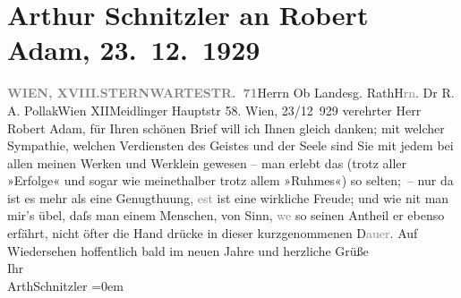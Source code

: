 

         
         \renewcommand{\erwaehntePersonen}{Personen: Robert Adam}
         \renewcommand{\erwaehnteOrte}{Orte: Meidlinger Hauptstraße, Sternwartestraße, Wien, XII., Meidling, XVIII., Währing}
         \renewcommand{\erwaehnteWerke}{}
               \section[Arthur Schnitzler an Robert Adam, 23. 12. 1929]{ Arthur Schnitzler an Robert Adam, 23. 12. 1929}\nopagebreak{}\rehead{ }\begin{ledgroupsized}[t]{13cm}\normalsize\beginnumbering \toendnotes[C]{\smallbreak\pagebreak[2]} 
\toendnotes[C]{\smallbreak}\pstart{}{\pb}\label{T_L02528-1v}\label{T_L02528-1h}\pend{}\pstart{}\textcolor{gray}{\textbf{WIEN, XVIII.}}\pend{}\pstart{}\textcolor{gray}{\textbf{STERNWARTESTR. 71}}\pend{}{\bigskip}\pstart{}Herrn Ob Landesg. Rath\pend{}\pstart{}H\textcolor{gray}{rn}. Dr R. A. Pollak\pend{}\pstart{}Wien XII\pend{}\pstart{}Meidlinger Hauptstr 58.\pend{}{\bigskip}\pstart
           \raggedleft{}{\pb}Wien, 23/12 929\pend
           \pstart
           verehrter Herr Robert Adam, für Ihren schönen Brief will ich
                    Ihnen gleich danken; mit welcher Sympathie, welchen Verdiensten des Geistes und
                    der Seele sind Sie mit jedem bei allen meinen Werken und Werklein gewesen – man
                    erlebt das (trotz aller »Erfolge« und sogar wie meinethalber trotz allem
                    »Ruhmes«) so selten; – nur da{\geminationn} ist es mehr als eine
                    Genugthuung, \textcolor{gray}{est} ist eine wirkliche Freude; und wie ni{\geminationm}t man mir’s übel, daſs {\pb}man einem Menschen, von Sinn, \introOben{}\textcolor{gray}{we{\geminationn}}\introOben{} so seinen Antheil er ebenso erfährt, nicht öfter die Hand drücke in
                    dieser kurzgenommenen D\textcolor{gray}{auer}.\pend
           \pstart
           Auf Wiedersehen hoffentlich bald im neuen Jahre und herzliche Grüße{\\[\baselineskip]}Ihr{\\[\baselineskip]}\spacefill\mbox{ArthSchnitzler}\pend
           \leftskip=0em{}
         
         \endnumbering{}\end{ledgroupsized}  \newcommand{\dateiname}{L02528}\newcommand{\titel}{Arthur Schnitzler an Robert Adam, 23. 12. 1929}\newcommand{\editorInnen}{Martin Anton Müller und Gerd-Hermann Susen}
      